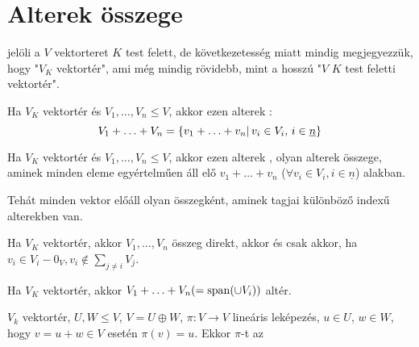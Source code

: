 \section{Alterek összege}
\begin{jel}
	 jelöli a $V$ vektorteret $K$ test felett, de következetesség miatt
	mindig megjegyezzük, hogy "$V_K$ vektortér", ami még mindig rövidebb,
	mint a hosszú "$V$ $K$ test feletti vektortér".
\end{jel}

\begin{ff}
	Ha $V_K$ vektortér és $V_1,\ldots,V_n\leq V$, akkor ezen alterek
	:
	\begin{equation*}
		V_1+\ldots+V_n=\{v_1+\ldots +v_n|\,v_i\in V_i,\,i\in\underline{n}\}
	\end{equation*}
\end{ff}
\begin{ff}
	Ha $V_K$ vektortér és $V_1,\ldots,V_n\leq V$, akkor ezen alterek
	, olyan alterek összege, aminek minden eleme
	egyértelműen áll elő $v_1+\ldots+v_n$ ($\forall v_i\in
	V_i, i\in\underline{n}$) alakban.
\end{ff}
\begin{megj}
	Tehát minden vektor előáll olyan összegként, aminek tagjai különböző
	indexű alterekben van.
\end{megj}
\begin{all}
	Ha $V_K$ vektortér, akkor $V_1,\ldots,V_n$ összeg direkt, akkor és
	csak akkor, ha $v_i\in V_i-{0_V},v_i\not\in\sum_{j\neq i}V_j$.
\end{all}
\begin{all}
	Ha $V_K$ vektortér, akkor $V_1+\ldots +V_n(=\operatorname{span}(\cup V_i))$ altér.
\end{all}
\begin{ff}
	$V_k$ vektortér, $U,W\leq V$, $V=U\oplus W$, $\pi :V\to V$ lineáris
	leképezés, $u\in U$, $w\in W$, hogy $v=u+w \in V$ esetén $\pi(v)=u$.
	Ekkor $\pi$-t az 
\end{ff}


